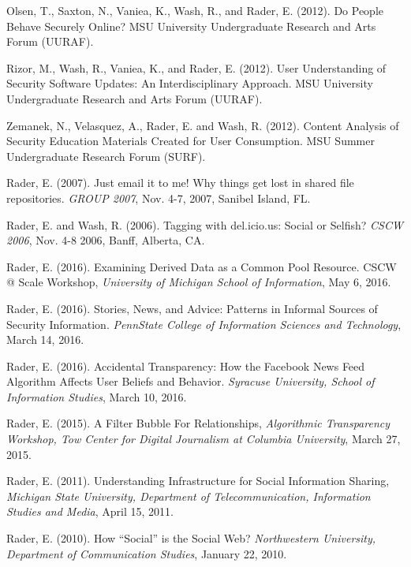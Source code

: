 \documentclass[9pt]{extarticle}
\makeatletter
\renewcommand{\section}{%
  \@startsection{section}{1}{0em}{\baselineskip}{3pt}{\large\bfseries\textsc}}
\makeatother
\begin{document}
Olsen, T., Saxton, N., Vaniea, K., Wash, R., and Rader, E. (2012). Do People Behave Securely Online? MSU University Undergraduate Research and Arts Forum (UURAF).

Rizor, M., Wash, R., Vaniea, K., and Rader, E. (2012). User Understanding of Security Software Updates: An Interdisciplinary Approach. MSU University Undergraduate Research and Arts Forum (UURAF).

Zemanek, N., Velasquez, A., Rader, E. and Wash, R. (2012). Content Analysis of Security Education Materials Created for User Consumption. MSU Summer Undergraduate Research Forum (SURF).
  
Rader, E. (2007). Just email it to me! Why things get lost in shared file repositories. \emph{GROUP 2007}, Nov. 4-7, 2007, Sanibel Island, FL.

Rader, E. and Wash, R. (2006). Tagging with del.icio.us: Social or Selfish? \emph{CSCW 2006}, Nov. 4-8 2006, Banff, Alberta, CA.
 

\section{External Presentations}

Rader, E. (2016). Examining Derived Data as a Common Pool Resource. CSCW @ Scale Workshop, \emph{University of Michigan School of Information}, May 6, 2016.

Rader, E. (2016). Stories, News, and Advice: Patterns in Informal Sources of Security Information. \emph{PennState College of Information Sciences and Technology}, March 14, 2016.

Rader, E. (2016). Accidental Transparency: How the Facebook News Feed Algorithm Affects User Beliefs and Behavior. \emph{Syracuse University, School of Information Studies}, March 10, 2016.

Rader, E. (2015). A Filter Bubble For Relationships, \emph{Algorithmic Transparency Workshop, Tow Center for Digital Journalism at Columbia University}, March 27, 2015.

Rader, E. (2011). Understanding Infrastructure for Social Information Sharing, \emph{Michigan State University, Department of Telecommunication, Information Studies and Media}, April 15, 2011.

Rader, E. (2010). How ``Social'' is the Social Web? \emph{Northwestern University, Department of Communication Studies}, January 22, 2010.
\end{document}
